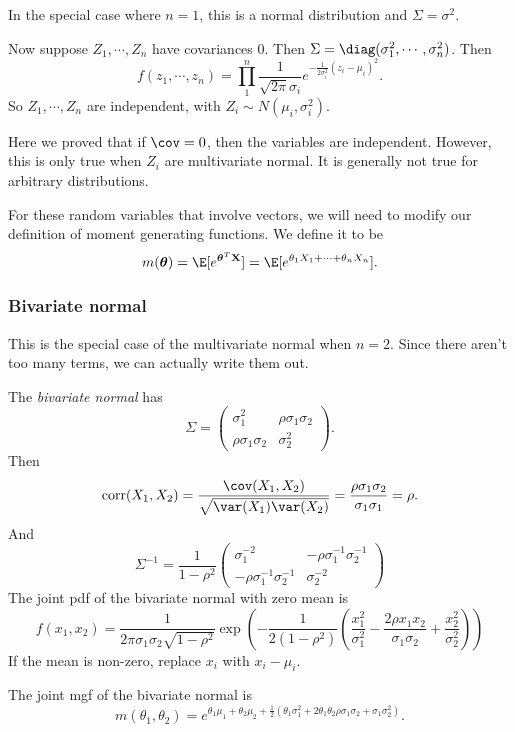 \documentclass[a4paper]{article}
\begin{document}
In the special case where $n = 1$, this is a normal distribution and $\Sigma = \sigma^2$.

Now suppose $Z_1, \cdots, Z_n$ have covariances $0$. Then $\Sigma = \diag(\sigma_1^2, \cdots, \sigma_n^2)$. Then
\[
  f(z_1, \cdots, z_n) = \prod_1^n \frac{1}{\sqrt{2\pi}\sigma_i} e^{-\frac{1}{2\sigma_i^2}(z_i - \mu_i)^2}.
\]
So $Z_1, \cdots, Z_n$ are independent, with $Z_i\sim N(\mu_i, \sigma_i^2)$.

Here we proved that if $\cov = 0$, then the variables are independent. However, this is only true when $Z_i$ are multivariate normal. It is generally not true for arbitrary distributions.

For these random variables that involve vectors, we will need to modify our definition of moment generating functions. We define it to be
\[
  m(\boldsymbol\theta) = \E[e^{\boldsymbol\theta^T \mathbf{X}}] = \E[e^{\theta_1 X_1 + \cdots + \theta_n X_n}].
\]
\subsubsection*{Bivariate normal}
This is the special case of the multivariate normal when $n = 2$. Since there aren't too many terms, we can actually write them out.

The \emph{bivariate normal} has
\[
  \Sigma=
  \begin{pmatrix}
    \sigma_1^2 & \rho\sigma_1\sigma_2\\
    \rho\sigma_1\sigma_2 & \sigma_2^2
  \end{pmatrix}.
\]
Then
\[
  \mathrm{corr}(X_1, X_2) = \frac{\cov(X_1, X_2)}{\sqrt{\var(X_1)\var(X_2)}} = \frac{\rho\sigma_1\sigma_2}{\sigma_1\sigma_1} = \rho.
\]
And
\[
  \Sigma^{-1} = \frac{1}{1 - \rho^2}
  \begin{pmatrix}
    \sigma_1^{-2} & -\rho\sigma_1^{-1}\sigma_2^{-1}\\
    -\rho\sigma_1^{-1}\sigma_2^{-1} & \sigma_2^{-2}
  \end{pmatrix}
\]
The joint pdf of the bivariate normal with zero mean is
\[
  f(x_1, x_2) = \frac{1}{2\pi \sigma_1 \sigma_2 \sqrt{1 - \rho^2}} \exp\left(-\frac{1}{2(1 - \rho^2)}\left(\frac{x_1^2}{\sigma_1^2} - \frac{2\rho x_1x_2}{\sigma_1\sigma_2} + \frac{x_2^2}{\sigma_2^2}\right)\right)
\]
If the mean is non-zero, replace $x_i$ with $x_i - \mu_i$.

The joint mgf of the bivariate normal is
\[
  m(\theta_1, \theta_2) = e^{\theta_1\mu_1 + \theta_2 \mu_2 + \frac{1}{2}(\theta_1\sigma_1^2 + 2\theta_1\theta_2\rho\sigma_1\sigma_2 + \sigma_1\sigma_2^2)}.
\]
\end{document}
